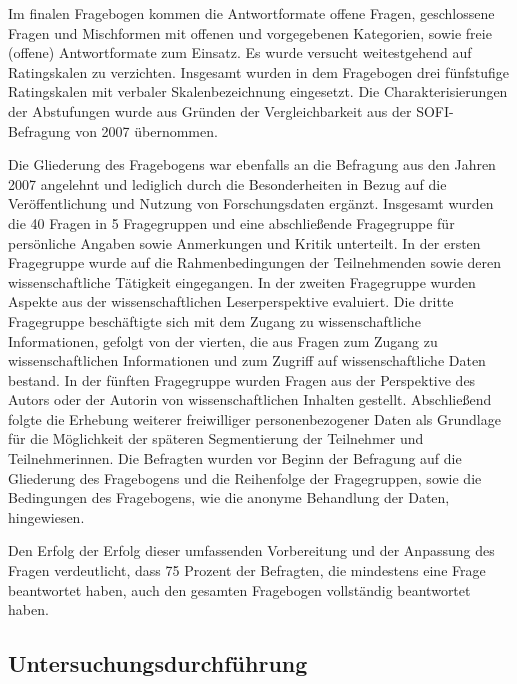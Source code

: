 Im finalen Fragebogen kommen die Antwortformate offene Fragen, geschlossene Fragen und Mischformen mit offenen und vorgegebenen Kategorien, sowie freie (offene) Antwortformate zum Einsatz. Es wurde versucht weitestgehend auf Ratingskalen zu verzichten. Insgesamt wurden in dem Fragebogen drei fünfstufige Ratingskalen mit verbaler Skalenbezeichnung eingesetzt. Die Charakterisierungen der Abstufungen wurde aus Gründen der Vergleichbarkeit aus der SOFI-Befragung von 2007 übernommen.

Die Gliederung des Fragebogens war ebenfalls an die Befragung aus den Jahren 2007 angelehnt und lediglich durch die Besonderheiten in Bezug auf die Veröffentlichung und Nutzung von Forschungsdaten ergänzt. Insgesamt wurden die 40 Fragen in 5 Fragegruppen und eine abschließende Fragegruppe für persönliche Angaben sowie Anmerkungen und Kritik unterteilt. In der ersten Fragegruppe wurde auf die Rahmenbedingungen der Teilnehmenden sowie deren wissenschaftliche Tätigkeit eingegangen. In der zweiten Fragegruppe wurden Aspekte aus der wissenschaftlichen Leserperspektive evaluiert. Die dritte Fragegruppe beschäftigte sich mit dem Zugang zu wissenschaftliche Informationen, gefolgt von der vierten, die aus Fragen zum Zugang zu wissenschaftlichen Informationen und zum Zugriff auf wissenschaftliche Daten bestand. In der fünften Fragegruppe wurden Fragen aus der Perspektive des Autors oder der Autorin von wissenschaftlichen Inhalten gestellt. Abschließend folgte die Erhebung weiterer freiwilliger personenbezogener Daten als Grundlage für die Möglichkeit der späteren Segmentierung der Teilnehmer und Teilnehmerinnen. Die Befragten wurden vor Beginn der Befragung auf die Gliederung des Fragebogens und die Reihenfolge der Fragegruppen, sowie die Bedingungen des Fragebogens, wie die anonyme Behandlung der Daten, hingewiesen.

Den Erfolg der Erfolg dieser umfassenden Vorbereitung und der Anpassung des Fragen verdeutlicht, dass 75 Prozent der Befragten, die mindestens eine Frage beantwortet haben, auch den gesamten Fragebogen vollständig beantwortet haben.

\subsection{Untersuchungsdurchführung}

